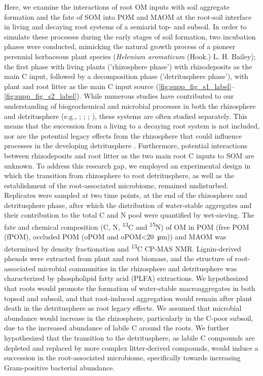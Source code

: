 Here, we examine the interactions of root OM inputs with soil aggregate formation and the fate of SOM into POM and MAOM at the root-soil interface in living and decaying root systems of a semiarid top- and subsoil. In order to simulate these processes during the early stages of soil formation, two incubation phases were conducted, mimicking the natural growth process of a pioneer perennial herbaceous plant species (\textit{Helenium aromaticum} (Hook.) L. H. Bailey); the first phase with living plants ('rhizosphere phase') with rhizodeposits as the main C input, followed by a decomposition phase ('detritusphere phase'), with plant and root litter as the main C input source (\cref{fig:supp_fig_s1_label}--\cref{fig:supp_fig_s2_label}). While numerous studies have contributed to our understanding of biogeochemical and microbial processes in both the rhizosphere and detritusphere (e.g., \citealp{Poll2008}; \citealp{Marschner2012}; \citealp{Tian2013}; \citealp{Vidal2021}), these systems are often studied separately. This means that the succession from a living to a decaying root system is not included, nor are the potential legacy effects from the rhizosphere that could influence processes in the developing detritusphere \citep{Wurst2015}. Furthermore, potential interactions between rhizodeposits and root litter as the two main root C inputs to SOM are unknown. To address this research gap, we employed an experimental design in which the transition from rhizosphere to root detritusphere, as well as the establishment of the root-associated microbiome, remained undisturbed. Replicates were sampled at two time points, at the end of the rhizosphere and detritusphere phase, after which the distribution of water-stable aggregates and their contribution to the total C and N pool were quantified by wet-sieving. The fate and chemical composition (C, N, \textsuperscript{13}C and \textsuperscript{15}N) of OM in POM (free POM (fPOM), occluded POM (oPOM and oPOM<\SI{20}{\micro\metre})) and MAOM was determined by density fractionation and \textsuperscript{13}C CP-MAS NMR. Lignin-derived phenols were extracted from plant and root biomass, and the structure of root-associated microbial communities in the rhizosphere and detritusphere was characterized by phospholipid fatty acid (PLFA) extractions. We hypothesized that roots would promote the formation of water-stable macroaggregates in both topsoil and subsoil, and that root-induced aggregation would remain after plant death in the detritusphere as root legacy effects. We assumed that microbial abundance would increase in the rhizosphere, particularly in the C-poor subsoil, due to the increased abundance of labile C around the roots. We further hypothesized that the transition to the detritusphere, as labile C compounds are depleted and replaced by more complex litter-derived compounds, would induce a succession in the root-associated microbiome, specifically towards increasing Gram-positive bacterial abundance.

